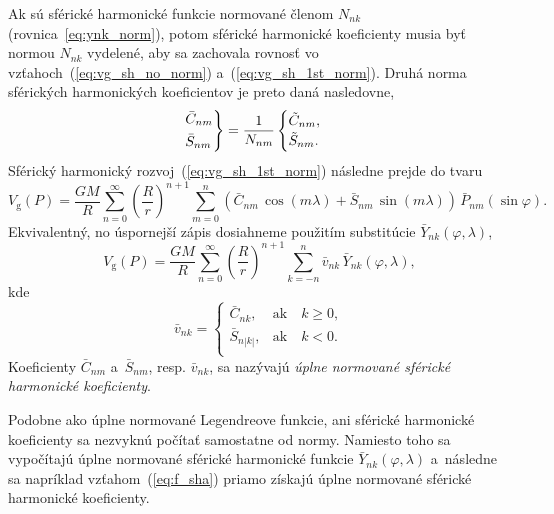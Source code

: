 \documentclass[a4paper, 12pt]{book}
\newcommand{\gidx}{\mathrm g}
\begin{document}
Ak sú sférické harmonické funkcie normované členom $N_{nk}$ 
(rovnica~\ref{eq:ynk_norm}), potom sférické harmonické koeficienty musia byť 
normou $N_{nk}$ vydelené, aby sa zachovala rovnosť vo 
vzťahoch~(\ref{eq:vg_sh_no_norm}) a~(\ref{eq:vg_sh_1st_norm}).  Druhá norma 
sférických harmonických koeficientov je preto daná nasledovne,
%
\begin{equation}
\label{eq:cnm_snm_2nd_norm}
\begin{rcases}
\bar{C}_{nm}\\
\bar{S}_{nm}
\end{rcases}
= \frac{1}{N_{nm}}
\begin{cases}
\tilde{C}_{nm}{,}\\
\tilde{S}_{nm}{.}
\end{cases}
\end{equation}
%
Sférický harmonický rozvoj~(\ref{eq:vg_sh_1st_norm}) následne prejde do tvaru
%
\begin{equation}
\label{eq:vg_sh_2nd_norm}
V_\gidx(P) = \frac{GM}{R} \sum_{n = 0}^\infty \left( \frac{R}{r} \right)^{n
+ 1} \sum_{m = 0}^{n} \left( \bar{C}_{nm} \, \cos(m\lambda) + \bar{S}_{nm} \,
\sin(m\lambda)\right) \, \bar{P}_{nm}(\sin\varphi){.}
\end{equation}
%
Ekvivalentný, no úspornejší zápis dosiahneme použitím substitúcie
$\bar{Y}_{nk}(\varphi, \lambda)$,
%
\begin{equation}
\label{eq:vg_sh_2nd_norm_ynk}
V_\gidx(P) = \frac{GM}{R} \sum_{n = 0}^\infty \left( \frac{R}{r} \right)^{n
+ 1} \sum_{k = -n}^{n} \bar{v}_{nk} \, \bar{Y}_{nk}(\varphi, \lambda){,}
\end{equation}
kde
%
\begin{equation}
\bar{v}_{nk} =
%
\begin{cases}
\bar{C}_{nk}{,}    &\text{ak} \quad k \geq 0{,}\\
\bar{S}_{n|k|}{,}  &\text{ak} \quad k < 0{.}\\
\end{cases}
\end{equation}
%
Koeficienty $\bar{C}_{nm}$ a~$\bar{S}_{nm}$, resp. $\bar{v}_{nk}$, sa nazývajú
\emph{úplne normované sférické harmonické koeficienty}.

Podobne ako úplne normované Legendreove funkcie, ani sférické
harmonické koeficienty sa nezvyknú počítať samostatne od normy.  Namiesto toho
sa vypočítajú úplne normované sférické harmonické funkcie
$\bar{Y}_{nk}(\varphi, \lambda)$ a~následne sa napríklad
vzťahom~(\ref{eq:f_sha}) priamo získajú úplne normované sférické harmonické
koeficienty.
\end{document}
